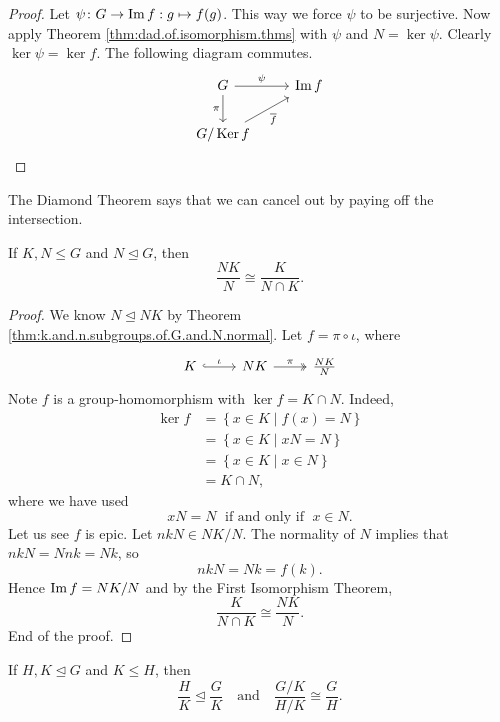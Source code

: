 \documentclass[11pt,a4paper]{article}
\begin{document}
\begin{proof}
    Let \(\psi \colon G\to \operatorname{Im} f : g\mapsto f(g) \).
    This way we force \(\psi\) to be surjective.
    Now apply  Theorem \ref{thm:dad.of.isomorphism.thms} with  \( \psi\) and \(N = \ker \psi\).
    Clearly \(\ker \psi = \ker f\).
    The following diagram commutes.
    \[\begin{tikzcd}
        G \arrow[r, "\psi"] \arrow[d, "\pi"'] & \im f \\
        G/\ker f   \arrow[ru, "\overline{f}"']    &  
        \end{tikzcd}\]
\end{proof}

The Diamond Theorem says that we can cancel out by paying off the intersection.

\begin{cor}
    If \(K,N \leq G\) and \(N\unlhd G\), then \[\frac{NK}{N}\cong \frac{K}{N\cap K}.\]
\end{cor}

\begin{proof}
We know \(N\unlhd NK\) by  Theorem \ref{thm:k.and.n.subgroups.of.G.and.N.normal}.
Let  \(f = \pi \circ \iota\), where 
\[\begin{tikzcd}
    K \arrow[r, "\iota", hook] & NK \arrow[r, "\pi", two heads] & \frac{NK}{N}
    \end{tikzcd}\]
Note \(f\) is a group-homomorphism with \(\ker f = K\cap N\).
Indeed,
\begin{align*}
\ker f &= \left\{ x\in K \mid f(x) = N \right\}\\
&= \left\{ x\in K \mid xN = N   \right\}\\
&= \left\{ x\in K\mid x\in N \right\}\\
&= K\cap N,
\end{align*}
where we have used \[xN = N \;\text{ if and only if }\; x\in N.\]
Let us see \(f\) is epic.
Let \(nkN \in NK/N\).
The normality of \(N\) implies that \(nkN = Nnk = Nk\), so  \[nkN  =Nk = f(k).\]
Hence \(\operatorname{Im} f = NK/ N\) and  by the First Isomorphism Theorem, 
\[\frac{K}{N\cap K}\cong \frac{NK}{N}.\]
End of the proof.
\end{proof}


\begin{cor}
    If \(H,K\unlhd G\) and \(K\leq H\), then 
    \[\frac{H}{K}  \unlhd \frac{G}{K} \quad\text{and}\quad \frac{G/ K}{H/K}\cong \frac{G}{H}.\]
\end{cor}
\end{document}
